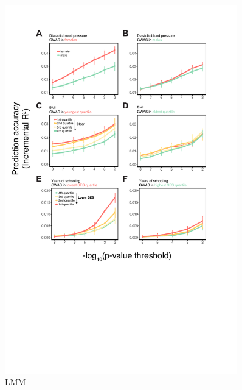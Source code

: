 \documentclass[hidelinks, 12pt]{article}
\begin{document}
\begin{figure}[h!]
\includegraphics[width=0.9\textwidth]{./supp_figures/bolt.pdf}
\caption{LMM}
\centering
\end{figure}
\end{document}
